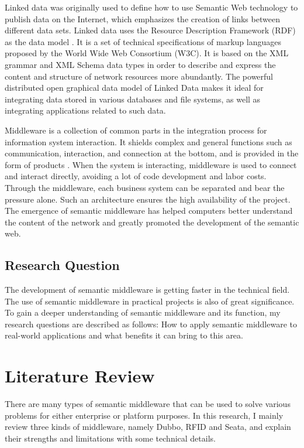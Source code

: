 \documentclass[conference]{IEEEtran}
\begin{document}
Linked data was originally used to define how to use Semantic Web technology to publish data on the Internet, which emphasizes the creation of links between different data sets. Linked data uses the Resource Description Framework (RDF) as the data model \cite{b2}. It is a set of technical specifications of markup languages proposed by the World Wide Web Consortium (W3C). It is based on the XML grammar and XML Schema data types in order to describe and express the content and structure of network resources more abundantly. The powerful distributed open graphical data model of Linked Data makes it ideal for integrating data stored in various databases and file systems, as well as integrating applications related to such data.

Middleware is a collection of common parts in the integration process for information system interaction. It shields complex and general functions such as communication, interaction, and connection at the bottom, and is provided in the form of products \cite{b3}. When the system is interacting, middleware is used to connect and interact directly, avoiding a lot of code development and labor costs. Through the middleware, each business system can be separated and bear the pressure alone. Such an architecture ensures the high availability of the project. The emergence of semantic middleware has helped computers better understand the content of the network and greatly promoted the development of the semantic web.

\subsection{Research Question}
The development of semantic middleware is getting faster in the technical field. The use of semantic middleware in practical projects is also of great significance. To gain a deeper understanding of semantic middleware and its function, my research questions are described as follows: 
How to apply semantic middleware to real-world applications and what benefits it can bring to this area.

\section{Literature Review}

There are many types of semantic middleware that can be used to solve various problems for either enterprise or platform purposes. In this research, I mainly review three kinds of middleware, namely Dubbo, RFID and Seata, and explain their strengths and limitations with some technical details.
\end{document}
